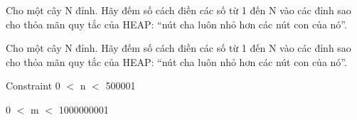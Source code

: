 Cho một cây N đỉnh. Hãy đếm số cách điền các số từ 1 đến N vào các đỉnh sao cho thỏa mãn quy tắc của HEAP: “nút cha luôn nhỏ hơn các nút con của nó”.

Cho một cây N đỉnh. Hãy đếm số cách điền các số từ 1 đến N vào các đỉnh sao cho thỏa mãn quy tắc của HEAP: “nút cha luôn nhỏ hơn các nút con của nó”.

Constraint
0 $<$ n $<$ 500001

0 $<$ m $<$ 1000000001